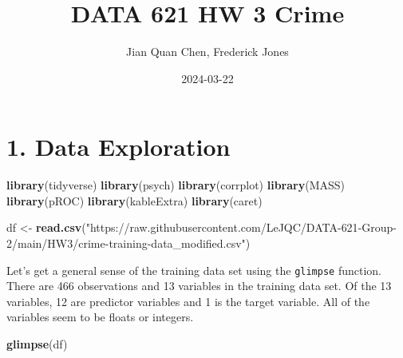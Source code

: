 \documentclass[
]{article}
\title{DATA 621 HW 3 Crime}
\author{Jian Quan Chen, Frederick Jones}
\date{2024-03-22}
\newenvironment{Shaded}{\begin{snugshade}}{\end{snugshade}}
\newcommand{\FunctionTok}[1]{\textcolor[rgb]{0.13,0.29,0.53}{\textbf{#1}}}
\newcommand{\NormalTok}[1]{#1}
\newcommand{\OtherTok}[1]{\textcolor[rgb]{0.56,0.35,0.01}{#1}}
\newcommand{\StringTok}[1]{\textcolor[rgb]{0.31,0.60,0.02}{#1}}
\begin{document}
\maketitle

\hypertarget{data-exploration}{%
\section{1. Data Exploration}\label{data-exploration}}

\begin{Shaded}
\begin{Highlighting}[]
\FunctionTok{library}\NormalTok{(tidyverse)}
\FunctionTok{library}\NormalTok{(psych)}
\FunctionTok{library}\NormalTok{(corrplot)}
\FunctionTok{library}\NormalTok{(MASS)}
\FunctionTok{library}\NormalTok{(pROC)}
\FunctionTok{library}\NormalTok{(kableExtra)}
\FunctionTok{library}\NormalTok{(caret)}
\end{Highlighting}
\end{Shaded}

\begin{Shaded}
\begin{Highlighting}[]
\NormalTok{df }\OtherTok{\textless{}{-}} \FunctionTok{read.csv}\NormalTok{(}\StringTok{"https://raw.githubusercontent.com/LeJQC/DATA{-}621{-}Group{-}2/main/HW3/crime{-}training{-}data\_modified.csv"}\NormalTok{)}
\end{Highlighting}
\end{Shaded}

Let's get a general sense of the training data set using the
\texttt{glimpse} function. There are 466 observations and 13 variables
in the training data set. Of the 13 variables, 12 are predictor
variables and 1 is the target variable. All of the variables seem to be
floats or integers.

\begin{Shaded}
\begin{Highlighting}[]
\FunctionTok{glimpse}\NormalTok{(df)}
\end{Highlighting}
\end{Shaded}
\end{document}

